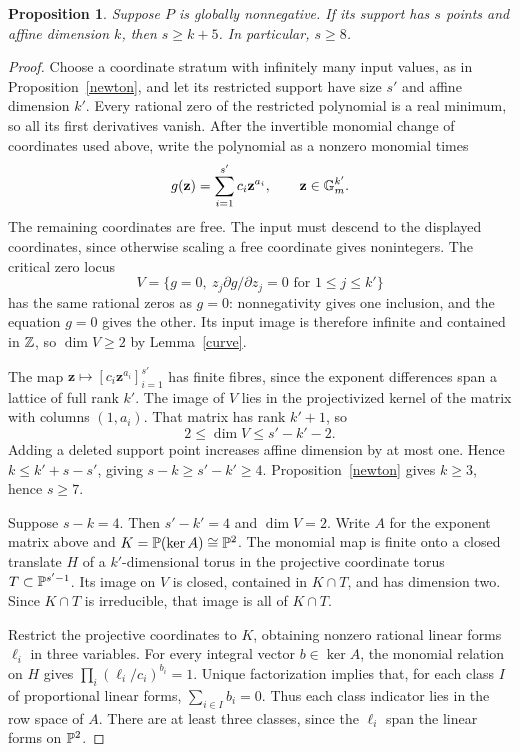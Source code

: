 \documentclass[11pt]{article}
\newtheorem{proposition}[theorem]{Proposition}
\theoremstyle{remark}\newtheorem{remark}[theorem]{Remark}
\begin{document}
\begin{proposition}\label{nonnegative-support}
Suppose \(P\) is globally nonnegative. If its support has \(s\) points and affine dimension \(k\), then \(s\ge k+5\). In particular, \(s\ge8\).
\end{proposition}
\begin{proof}
Choose a coordinate stratum with infinitely many input values, as in Proposition~\ref{newton}, and let its restricted support have size \(s'\) and affine dimension \(k'\). Every rational zero of the restricted polynomial is a real minimum, so all its first derivatives vanish. After the invertible monomial change of coordinates used above, write the polynomial as a nonzero monomial times
\[
 g(\mathbf z)=\sum_{i=1}^{s'}c_i\mathbf z^{a_i},\qquad
 \mathbf z\in\mathbb G_m^{k'}.
\]
The remaining coordinates are free. The input must descend to the displayed coordinates, since otherwise scaling a free coordinate gives nonintegers. The critical zero locus
\[
 V=\{g=0,\ z_j\partial g/\partial z_j=0\text{ for }1\le j\le k'\}
\]
has the same rational zeros as \(g=0\): nonnegativity gives one inclusion, and the equation \(g=0\) gives the other. Its input image is therefore infinite and contained in \(\mathbb Z\), so \(\dim V\ge2\) by Lemma~\ref{curve}.

The map \(\mathbf z\mapsto[c_i\mathbf z^{a_i}]_{i=1}^{s'}\) has finite fibres, since the exponent differences span a lattice of full rank \(k'\). The image of \(V\) lies in the projectivized kernel of the matrix with columns \((1,a_i)\). That matrix has rank \(k'+1\), so
\[
 2\le\dim V\le s'-k'-2.
\]
Adding a deleted support point increases affine dimension by at most one. Hence \(k\le k'+s-s'\), giving \(s-k\ge s'-k'\ge4\). Proposition~\ref{newton} gives \(k\ge3\), hence \(s\ge7\).

Suppose \(s-k=4\). Then \(s'-k'=4\) and \(\dim V=2\). Write \(A\) for the exponent matrix above and \(K=\mathbb P(\ker A)\cong\mathbb P^2\). The monomial map is finite onto a closed translate \(H\) of a \(k'\)-dimensional torus in the projective coordinate torus \(T\subset\mathbb P^{s'-1}\). Its image on \(V\) is closed, contained in \(K\cap T\), and has dimension two. Since \(K\cap T\) is irreducible, that image is all of \(K\cap T\).

Restrict the projective coordinates to \(K\), obtaining nonzero rational linear forms \(\ell_i\) in three variables. For every integral vector \(b\in\ker A\), the monomial relation on \(H\) gives
\(\prod_i(\ell_i/c_i)^{b_i}=1\). Unique factorization implies that, for each class \(I\) of proportional linear forms, \(\sum_{i\in I}b_i=0\). Thus each class indicator lies in the row space of \(A\). There are at least three classes, since the \(\ell_i\) span the linear forms on \(\mathbb P^2\).


\end{proof}
\end{document}

